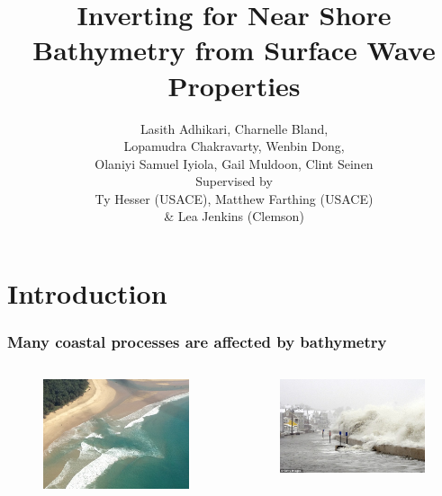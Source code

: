 \documentclass[7pt]{beamer}
\title[Bathymetry Inversion from Waves]{Inverting for Near Shore Bathymetry from Surface Wave Properties}
\author[]{
      Lasith Adhikari, Charnelle Bland, \\
      Lopamudra Chakravarty, Wenbin Dong, \\
      Olaniyi Samuel Iyiola, Gail Muldoon, Clint Seinen \\
      \vspace{5mm}
      Supervised by\\ Ty  Hesser (USACE), Matthew Farthing (USACE) \\ \& Lea Jenkins (Clemson)}
\institute[IMSM]{Industrial Mathematical and Statistical Modeling Workshop}
\date{}
\begin{document}
    \frame{\titlepage}

    \section{Introduction}

    \begin{frame}
      \frametitle{Many coastal processes are affected by bathymetry}
      \begin{columns}
        \begin{figure}[h!]
          \includegraphics[width=1\linewidth]{img/Rip_C.JPG}\hfill
        \end{figure}
        \begin{figure}
          \includegraphics[width=1\linewidth]{img/C_Flood.jpg}\vfill

\end{figure}
\end{columns}
\end{frame}
\end{document}
